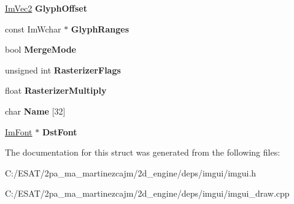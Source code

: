 \begin{DoxyCompactItemize}
\mbox{\label{struct_im_font_config_a290a81956fdcb7ad3b5e3152594db121}} 
\hyperlink{struct_im_vec2}{Im\+Vec2} {\bfseries Glyph\+Offset}
\item 
\mbox{\label{struct_im_font_config_aa174ceff80323012cd1b717d864258dd}} 
const Im\+Wchar $\ast$ {\bfseries Glyph\+Ranges}
\item 
\mbox{\label{struct_im_font_config_ad5cab281622e5bdec8e2d55cadc5601e}} 
bool {\bfseries Merge\+Mode}
\item 
\mbox{\label{struct_im_font_config_a80d05eea7733731a3e9ac1d9e905e5b3}} 
unsigned int {\bfseries Rasterizer\+Flags}
\item 
\mbox{\label{struct_im_font_config_a9365265cc52098a8ecf89ff47f6106f2}} 
float {\bfseries Rasterizer\+Multiply}
\item 
\mbox{\label{struct_im_font_config_abcd5db10139b42fbac90e31512c64f08}} 
char {\bfseries Name} \mbox{[}32\mbox{]}
\item 
\mbox{\label{struct_im_font_config_a561773c311f6cf6de00642c2801e7b92}} 
\hyperlink{struct_im_font}{Im\+Font} $\ast$ {\bfseries Dst\+Font}
\end{DoxyCompactItemize}


The documentation for this struct was generated from the following files\+:\begin{DoxyCompactItemize}
\item 
C\+:/\+E\+S\+A\+T/2pa\+\_\+ma\+\_\+martinezcajm/2d\+\_\+engine/deps/imgui/imgui.\+h\item 
C\+:/\+E\+S\+A\+T/2pa\+\_\+ma\+\_\+martinezcajm/2d\+\_\+engine/deps/imgui/imgui\+\_\+draw.\+cpp\end{DoxyCompactItemize}
